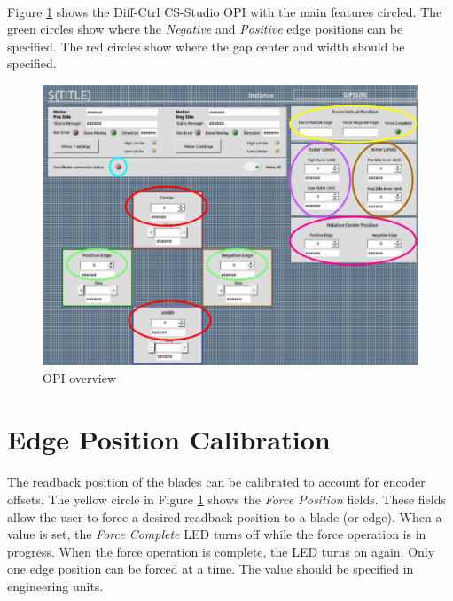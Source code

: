 \documentclass[openany]{article}
\begin{document}
    \paragraph{} Figure \ref{fig:opi-overview} shows the Diff-Ctrl CS-Studio OPI with the main features circled. The green circles show where the \emph{Negative} and \emph{Positive} edge positions can be specified. The red circles show where the gap center and width should be specified.

    \begin{figure}[!h]
        \caption{OPI overview}
        \label{fig:opi-overview}
        \centering
        \includegraphics[width=1.0\textwidth]{diff_ctrl_OPI}
    \end{figure}
    \FloatBarrier

\section{Edge Position Calibration}\label{sec:edge-pos-cal}

    \paragraph{} The readback position of the blades can be calibrated to account for encoder offsets. The yellow circle in Figure \ref{fig:opi-overview} shows the \emph{Force Position} fields. These fields allow the user to force a desired readback position to a blade (or edge). When a value is set, the \emph{Force Complete} LED turns off while the force operation is in progress. When the force operation is complete, the LED turns on again. Only one edge position can be forced at a time. The value should be specified in engineering units.
\end{document}
